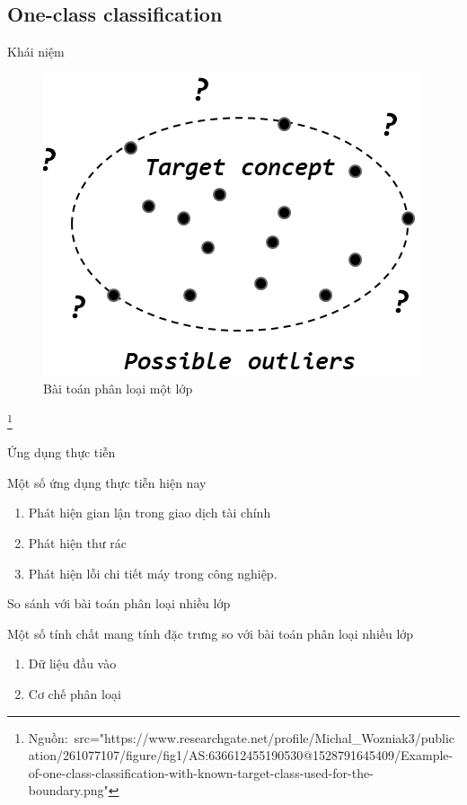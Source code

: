 \documentclass[
	10pt,                %
	aspectratio=169,     %
]{beamer}
\newcommand\footnotesource[1]{					%
	\vspace{-10mm}\let\thefootnote\relax\footnote{\hspace{-3mm}\tiny Nguồn:~#1}
}
\begin{document}
\subsection{One-class classification}
    \begin{frame}{Khái niệm}
    		\begin{figure}
		\centering
		\includegraphics[scale=0.35]{figures/occ.png}
		\caption{Bài toán phân loại một lớp}
	\end{figure}
	\footnotesource{src="https://www.researchgate.net/profile/Michal_Wozniak3/publication/261077107/figure/fig1/AS:636612455190530@1528791645409/Example-of-one-class-classification-with-known-target-class-used-for-the-boundary.png"} 
    	\end{frame}
    \begin{frame}{Ứng dụng thực tiễn}
    		\begin{block}{Một số ứng dụng thực tiễn hiện nay}
			\begin{enumerate}
				\item Phát hiện gian lận trong giao dịch tài chính
				\item Phát hiện thư rác
				\item Phát hiện lỗi chi tiết máy trong công nghiệp.
			\end{enumerate}
		\end{block}
    	\end{frame}
    	
	    \begin{frame}{So sánh với bài toán phân loại nhiều lớp}
		\begin{block}{Một số tính chất mang tính đặc trưng so với bài toán phân loại nhiều lớp}
		\begin{enumerate}
			\item Dữ liệu đầu vào
			\item Cơ chế phân loại
		\end{enumerate}
	\end{block}
	\end{frame}
	
\end{document}

